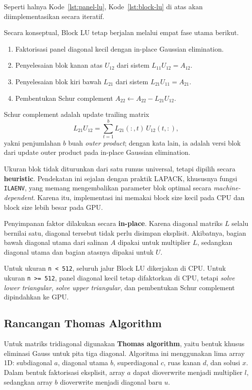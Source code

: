\documentclass[12pt,a4paper]{article}
\begin{document}
Seperti halnya Kode~\ref{lst:panel-lu}, Kode~\ref{lst:block-lu} di atas akan diimplementasikan secara iteratif.

Secara konseptual, Block LU tetap berjalan melalui empat fase utama berikut.
\begin{enumerate}[leftmargin=1.5em]
  \item Faktorisasi panel diagonal kecil dengan in-place Gaussian elimination.
  \item Penyelesaian blok kanan atas $U_{12}$ dari sistem $L_{11}U_{12}=A_{12}$.
  \item Penyelesaian blok kiri bawah $L_{21}$ dari sistem $L_{21}U_{11}=A_{21}$.
  \item Pembentukan Schur complement $A_{22}\leftarrow A_{22}-L_{21}U_{12}$.
\end{enumerate}

Schur complement adalah update trailing matrix
\[
L_{21}U_{12} = \sum_{t=1}^{b} L_{21}(:,t)\,U_{12}(t,:),
\]
yakni penjumlahan $b$ buah \emph{outer product}; dengan kata lain, ia adalah versi blok dari update outer product pada in-place Gaussian elimination.

Ukuran blok tidak diturunkan dari satu rumus universal, tetapi dipilih secara \textbf{heuristic}. Pendekatan ini sejalan dengan praktik LAPACK, khususnya fungsi \texttt{ILAENV}, yang memang mengembalikan parameter blok optimal secara \emph{machine-dependent}. Karena itu, implementasi ini memakai block size kecil pada CPU dan block size lebih besar pada GPU.

Penyimpanan faktor dilakukan secara \textbf{in-place}. Karena diagonal matriks $L$ selalu bernilai satu, diagonal tersebut tidak perlu disimpan eksplisit. Akibatnya, bagian bawah diagonal utama dari salinan $A$ dipakai untuk multiplier $L$, sedangkan diagonal utama dan bagian atasnya dipakai untuk $U$.

Untuk ukuran \texttt{n < 512}, seluruh jalur Block LU dikerjakan di CPU. Untuk ukuran \texttt{n >= 512}, panel diagonal kecil tetap difaktorkan di CPU, tetapi \emph{solve lower triangular}, \emph{solve upper triangular}, dan pembentukan Schur complement dipindahkan ke GPU.

\subsection{Rancangan Thomas Algorithm}
Untuk matriks tridiagonal digunakan \textbf{Thomas algorithm}, yaitu bentuk khusus eliminasi Gauss untuk pita tiga diagonal. Algoritma ini menggunakan lima array 1D: subdiagonal $a$, diagonal utama $b$, superdiagonal $c$, ruas kanan $d$, dan solusi $x$. Dalam bentuk faktorisasi eksplisit, array $a$ dapat dioverwrite menjadi multiplier $l$, sedangkan array $b$ dioverwrite menjadi diagonal baru $u$.
\end{document}
